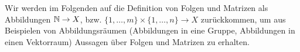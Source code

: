 \begin{bem}
 Wir werden im Folgenden auf die Definition von Folgen und Matrizen als Abbildungen $\mathbb{N} \to X$, bzw. $\{1, \dotsc, m\} \times \{1, \dotsc, n\} \to X$ zurückkommen, um aus Beispielen von Abbildungsräumen (Abbildungen in eine Gruppe, Abbildungen in einen Vektorraum) Aussagen über Folgen und Matrizen zu erhalten.
\end{bem}

